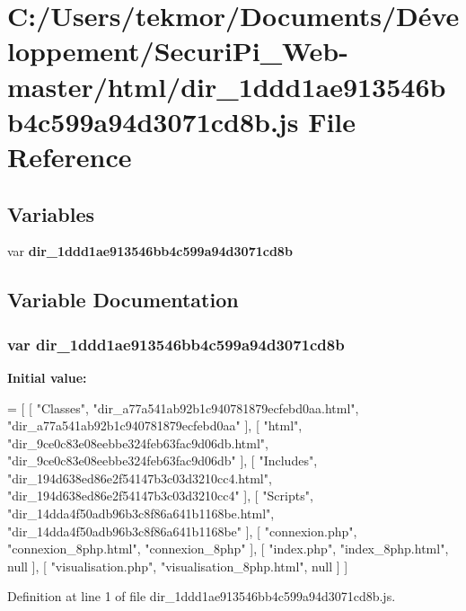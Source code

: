 \section{C\+:/\+Users/tekmor/\+Documents/\+Développement/\+Securi\+Pi\+\_\+\+Web-\/master/html/dir\+\_\+1ddd1ae913546bb4c599a94d3071cd8b.js File Reference}
\label{dir__1ddd1ae913546bb4c599a94d3071cd8b_8js}
\subsection*{Variables}
\begin{DoxyCompactItemize}
\item 
var {\bf dir\+\_\+1ddd1ae913546bb4c599a94d3071cd8b}
\end{DoxyCompactItemize}


\subsection{Variable Documentation}
\subsubsection[{dir\+\_\+1ddd1ae913546bb4c599a94d3071cd8b}]{\setlength{\rightskip}{0pt plus 5cm}var dir\+\_\+1ddd1ae913546bb4c599a94d3071cd8b}\label{dir__1ddd1ae913546bb4c599a94d3071cd8b_8js_ade5c9031a20aa17231ba93b603f9bac5}
{\bfseries Initial value\+:}
\begin{DoxyCode}
=
[
    [ \textcolor{stringliteral}{"Classes"}, \textcolor{stringliteral}{"dir\_a77a541ab92b1c940781879ecfebd0aa.html"}, \textcolor{stringliteral}{"dir\_a77a541ab92b1c940781879ecfebd0aa"} ],
    [ \textcolor{stringliteral}{"html"}, \textcolor{stringliteral}{"dir\_9ce0c83e08eebbe324feb63fac9d06db.html"}, \textcolor{stringliteral}{"dir\_9ce0c83e08eebbe324feb63fac9d06db"} ],
    [ \textcolor{stringliteral}{"Includes"}, \textcolor{stringliteral}{"dir\_194d638ed86e2f54147b3c03d3210cc4.html"}, \textcolor{stringliteral}{"dir\_194d638ed86e2f54147b3c03d3210cc4"} ],
    [ \textcolor{stringliteral}{"Scripts"}, \textcolor{stringliteral}{"dir\_14dda4f50adb96b3c8f86a641b1168be.html"}, \textcolor{stringliteral}{"dir\_14dda4f50adb96b3c8f86a641b1168be"} ],
    [ \textcolor{stringliteral}{"connexion.php"}, \textcolor{stringliteral}{"connexion\_8php.html"}, \textcolor{stringliteral}{"connexion\_8php"} ],
    [ \textcolor{stringliteral}{"index.php"}, \textcolor{stringliteral}{"index\_8php.html"}, null ],
    [ \textcolor{stringliteral}{"visualisation.php"}, \textcolor{stringliteral}{"visualisation\_8php.html"}, null ]
]
\end{DoxyCode}


Definition at line 1 of file dir\+\_\+1ddd1ae913546bb4c599a94d3071cd8b.\+js.

